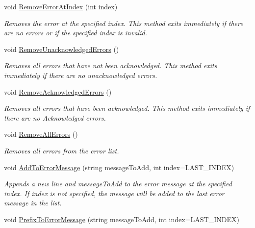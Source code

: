 \begin{DoxyCompactItemize}
void \mbox{\hyperlink{class_c_s_i_1_1_library_1_1_errors_1_1_error_list_a1e109d782cb81a4f5ce88599a97cf662}{Remove\+Error\+At\+Index}} (int index)
\begin{DoxyCompactList}\small\item\em Removes the error at the specified index. This method exits immediately if there are no errors or if the specified index is invalid. \end{DoxyCompactList}\item 
void \mbox{\hyperlink{class_c_s_i_1_1_library_1_1_errors_1_1_error_list_a41a138258732ef270f0089ac818617dd}{Remove\+Unacknowledged\+Errors}} ()
\begin{DoxyCompactList}\small\item\em Removes all errors that have not been acknowledged. This method exits immediately if there are no unacknowledged errors. \end{DoxyCompactList}\item 
void \mbox{\hyperlink{class_c_s_i_1_1_library_1_1_errors_1_1_error_list_a14fbdd40776f810b051edb6d5049e0a9}{Remove\+Acknowledged\+Errors}} ()
\begin{DoxyCompactList}\small\item\em Removes all errors that have been acknowledged. This method exits immediately if there are no Acknowledged errors. \end{DoxyCompactList}\item 
void \mbox{\hyperlink{class_c_s_i_1_1_library_1_1_errors_1_1_error_list_ad9bda10b1e69ab8218cbb6d78b8bdb60}{Remove\+All\+Errors}} ()
\begin{DoxyCompactList}\small\item\em Removes all errors from the error list. \end{DoxyCompactList}\item 
void \mbox{\hyperlink{class_c_s_i_1_1_library_1_1_errors_1_1_error_list_a0a74d769a7bb1ac855490f1d02c5fceb}{Add\+To\+Error\+Message}} (string message\+To\+Add, int index=L\+A\+S\+T\+\_\+\+I\+N\+D\+EX)
\begin{DoxyCompactList}\small\item\em Appends a new line and message\+To\+Add to the error message at the specified index. If index is not specified, the message will be added to the last error message in the list. \end{DoxyCompactList}\item 
void \mbox{\hyperlink{class_c_s_i_1_1_library_1_1_errors_1_1_error_list_a26df213cc94a946cb8c22749277b740c}{Prefix\+To\+Error\+Message}} (string message\+To\+Add, int index=L\+A\+S\+T\+\_\+\+I\+N\+D\+EX)

\end{DoxyCompactItemize}
